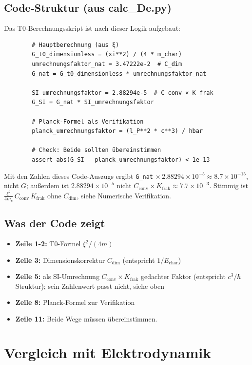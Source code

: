 	\subsection{Code-Struktur (aus calc\_De.py)}
	
	Das T0-Berechnungsskript ist nach dieser Logik aufgebaut:
	
	\begin{verbatim}
		# Hauptberechnung (aus ξ)
		G_t0_dimensionless = (xi**2) / (4 * m_char)
		umrechnungsfaktor_nat = 3.47222e-2  # C_dim
		G_nat = G_t0_dimensionless * umrechnungsfaktor_nat
		
		SI_umrechnungsfaktor = 2.88294e-5  # C_conv × K_frak
		G_SI = G_nat * SI_umrechnungsfaktor
		
		# Planck-Formel als Verifikation
		planck_umrechnungsfaktor = (l_P**2 * c**3) / hbar
		
		# Check: Beide sollten übereinstimmen
		assert abs(G_SI - planck_umrechnungsfaktor) < 1e-13
	\end{verbatim}
	

	Mit den Zahlen dieses Code-Auszugs ergibt \texttt{G\_nat} $\times\,2.88294\times10^{-5} \approx 8.7\times10^{-15}$, nicht $G$; außerdem ist $2.88294\times10^{-5}$ nicht $C_{\text{conv}}\times K_{\text{frak}} \approx 7.7\times10^{-3}$. Stimmig ist $\frac{\xi^2}{4m_e}\,C_{\text{conv}}\,K_{\text{frak}}$ ohne $C_{\text{dim}}$, siehe Numerische Verifikation.
	
	\subsection{Was der Code zeigt}
	
	\begin{itemize}
		\item \textbf{Zeile 1-2:} T0-Formel $\xi^2/(4m)$
		\item \textbf{Zeile 3:} Dimensionskorrektur $C_{\text{dim}}$ (entspricht $1/E_{\text{char}}$)
		\item \textbf{Zeile 5:} als SI-Umrechnung $C_{\text{conv}} \times K_{\text{frak}}$ gedachter Faktor (entspricht $c^3/\hbar$ Struktur); sein Zahlenwert passt nicht, siehe oben
		\item \textbf{Zeile 8:} Planck-Formel zur Verifikation
		\item \textbf{Zeile 11:} Beide Wege müssen übereinstimmen.
	\end{itemize}
	
	\section{Vergleich mit Elektrodynamik}
	

